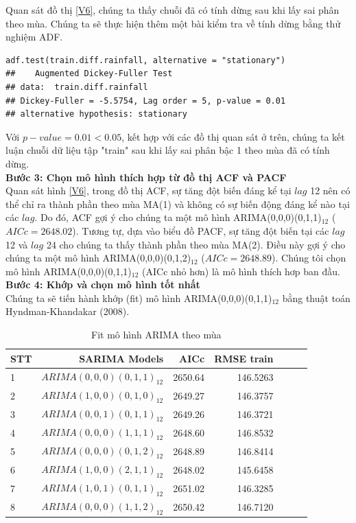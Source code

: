 \documentclass[12pt, a4paper,oneside]{book}
\theoremstyle{definition}
\begin{document}
Quan sát đồ thị \ref{V6}, chúng ta thấy chuỗi đã có tính dừng sau khi lấy sai phân theo mùa. Chúng ta sẽ thực hiện thêm một bài kiểm tra về tính dừng bằng thử nghiệm ADF. 
\begin{lstlisting}
adf.test(train.diff.rainfall, alternative = "stationary")
##	  Augmented Dickey-Fuller Test
## data:  train.diff.rainfall
## Dickey-Fuller = -5.5754, Lag order = 5, p-value = 0.01
## alternative hypothesis: stationary
\end{lstlisting}
Với $p-value = 0.01 < 0.05$, kết hợp với các đồ thị quan sát ở trên, chúng ta kết luận chuỗi dữ liệu tập "train" sau khi lấy sai phân bậc 1 theo mùa đã có tính dừng.\\
\textbf{Bước 3: Chọn mô hình thích hợp từ đồ thị ACF và PACF}\\
Quan sát hình \ref{V6}, trong đồ thị ACF, sự tăng đột biến đáng kể tại $lag$ 12 nên có thể chỉ ra thành phần theo mùa MA(1) và không có sự biến động đáng kể nào tại các $lag$. Do đó, ACF gợi ý cho chúng ta một mô hình ARIMA(0,0,0)(0,1,1)$_{12}$ ($AICc=2648.02$). Tương tự, dựa vào biểu đồ PACF, sự tăng đột biến tại các $lag$ 12 và $lag$ 24 cho chúng ta thấy thành phần theo mùa MA(2). Điều này gợi ý cho chúng ta một mô hình ARIMA(0,0,0)(0,1,2)$_{12}$ ($AICc=2648.89$). Chúng tôi chọn mô hình  ARIMA(0,0,0)(0,1,1)$_{12}$ (AICc nhỏ hơn) là mô hình thích hơp ban đầu.\\
\textbf{Bước 4: Khớp và chọn mô hình tốt nhất}\\
Chúng ta sẽ tiến hành khớp (fit) mô hình ARIMA(0,0,0)(0,1,1)$_{12}$ bằng thuật toán Hyndman-Khandakar (2008).
\begin{table}[!h]
	\caption{Fit mô hình ARIMA theo mùa}
	\label{fit_rainfall}
	\centering
	\fontsize{6}{10}\selectfont
	\begin{tabular}[t]{lrrrrrr}
		\toprule
		STT	& SARIMA Models & AICc & RMSE train\\
		\midrule
		\rowcolor{gray!6}  1 & $ARIMA(0,0,0)(0,1,1)_{12}$ & 2650.64  & 146.5263\\
		2 & $ARIMA(1,0,0)(0,1,0)_{12}$ & 2649.27 & 146.3757\\
		\rowcolor{gray!6}  3 & $ARIMA(0,0,1)(0,1,1)_{12}$ & 2649.26  & 146.3721\\
		4 & $ARIMA(0,0,0)(1,1,1)_{12}$ & 2648.60 & 146.8532\\
		\rowcolor{gray!6} 5  & $ARIMA(0,0,0)(0,1,2)_{12}$ & 2648.89 & 146.8414\\
		6 & $ARIMA(1,0,0)(2,1,1)_{12}$ & 2648.02 & 145.6458\\
        \rowcolor{gray!6} 7  & $ARIMA(1,0,1)(0,1,1)_{12}$ & 2651.02 & 146.3285\\
        8  & $ARIMA(0,0,0)(1,1,2)_{12}$ & 2650.42 & 146.7120\\
		\bottomrule
	\end{tabular}
\end{table}
\end{document}
